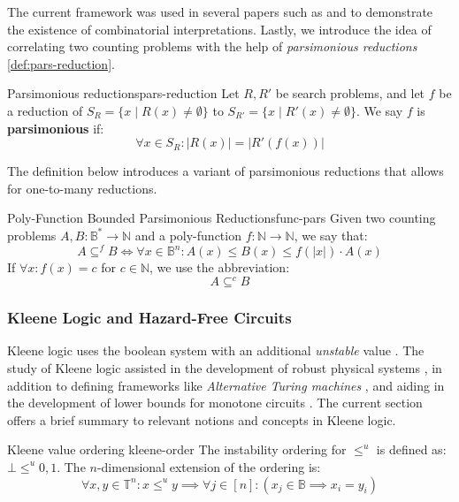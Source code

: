 The current framework was used in several papers such as
\cite{ikenmeyer_WhatWhatNot_2022} and \cite{ikenmeyer_PositivitySymmetricGroup_2024}
to demonstrate the existence of combinatorial interpretations.
Lastly, we introduce the idea of correlating two counting problems with the help of
\textit{parsimonious reductions} \ref{def:pars-reduction}.


\begin{definitionbox}{Parsimonious reductions}{pars-reduction}
    Let $R, R'$ be search problems, and let $f$ be a reduction of
    $S_R = \{x \mid R(x) \neq \emptyset \}$ to $S_{R'} = \{x \mid R'(x) \neq \emptyset \}$.
    We say $f$ is \textbf{parsimonious} if:
    $$
        \forall x \in S_R : |R(x)| = |R'(f(x))|
    $$
\end{definitionbox}

The definition below introduces a variant of parsimonious reductions that allows
for one-to-many reductions.
\begin{definitionbox}{Poly-Function Bounded Parsimonious Reductions}{func-pars}
    Given two counting problems $A, B : \mathbb{B}^* \to \mathbb{N}$
    and a poly-function $f : \mathbb{N} \to \mathbb{N}$, we
    say that:
    $$
        A \subseteq^f B \iff \forall x \in \mathbb{B}^n:  A(x) \leq B(x) \leq f(|x|) \cdot A(x)
    $$
    If $\forall x : f(x) = c$ for $c \in \mathbb{N}$, we use the abbreviation:
    $$
        A \subseteq^c B
    $$
\end{definitionbox}


\subsubsection{Kleene Logic and Hazard-Free Circuits}

Kleene logic uses the boolean system with an additional \textit{unstable} value \cite{kleene_IntroductionMetamathematics_2009}.
The study of Kleene logic assisted in
the development of robust physical systems \cite{friedrichs_MetastabilityContainingCircuits_2018}, in addition to defining frameworks like \textit{Alternative Turing machines} \cite{kozen_TheoryComputation_2006}, and
aiding in the development of lower bounds for monotone circuits
\cite{eichelberger_HazardDetectionCombinational_1965, ikenmeyer_ComplexityHazardfreeCircuits_2019,ikenmeyer_KarchmerWigdersonGamesHazardfree_2022,  bund_SmallHazardFreeTransducers_2025}.
The current section offers a brief summary to relevant notions and concepts in Kleene logic.

\begin{definitionbox}{Kleene value ordering \cite{mukaidono_BternaryLogicFunction_1972}}{kleene-order}
    The instability ordering for $\leq^u$ is defined as: $\bot \leq^u 0,1$. The $n$-dimensional
    extension of the ordering is:
    $$
        \forall x,y \in \mathbb{T}^n: x \leq^u y \implies \forall j \in [n]: (x_j \in \mathbb{B} \implies x_i = y_i)
    $$
\end{definitionbox}


